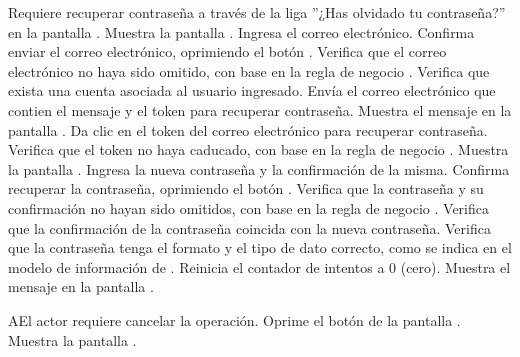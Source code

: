 \begin{UCtrayectoria}
	\UCpaso[\UCactor] Requiere recuperar contraseña a través de la liga ''¿Has olvidado tu contraseña?'' en la pantalla .
	\UCpaso[\UCsist] Muestra la pantalla .
	\UCpaso[\UCactor] Ingresa el correo electrónico.
	\label{cuc-1.1:recuperarCuenta}
	\UCpaso[\UCactor] Confirma enviar el correo electrónico, oprimiendo el botón . 
	\UCpaso[\UCsist] Verifica que el correo electrónico no haya sido omitido, con base en la regla de negocio .  
	\UCpaso[\UCsist] Verifica que exista una cuenta asociada al usuario ingresado.  
	\UCpaso[\UCsist] Envía el correo electrónico que contien el mensaje  y el token para recuperar contraseña.
	\UCpaso[\UCsist] Muestra el mensaje  en la pantalla .
	\UCpaso[\UCactor] Da clic en el token del correo electrónico para recuperar contraseña.
	\UCpaso[\UCsist] Verifica que el token no haya caducado, con base en la regla de negocio . 
	\UCpaso[\UCsist] Muestra la pantalla .
	\UCpaso[\UCactor] Ingresa la nueva contraseña y la confirmación de la misma.
	\label{cuc-1.1:recuperaCuenta}
	\UCpaso[\UCactor] Confirma recuperar la contraseña, oprimiendo el botón . 
	\UCpaso[\UCsist] Verifica que la contraseña y su confirmación no hayan sido omitidos, con base en la regla de negocio .  
	\UCpaso[\UCsist] Verifica que la confirmación de la contraseña coincida con la nueva contraseña.  
	\UCpaso[\UCsist] Verifica que la contraseña tenga el formato y el tipo de dato correcto, como se indica en el modelo de información de . 
	\UCpaso[\UCsist] Reinicia el contador de intentos a 0 (cero).
	\UCpaso[\UCsist] Muestra el mensaje  en la pantalla .
\end{UCtrayectoria}


\begin{UCtrayectoriaA}{A}{El actor requiere cancelar la operación.}
	\UCpaso[\UCactor] Oprime el botón  de la pantalla .
	\UCpaso[\UCsist] Muestra la pantalla .
\end{UCtrayectoriaA}

